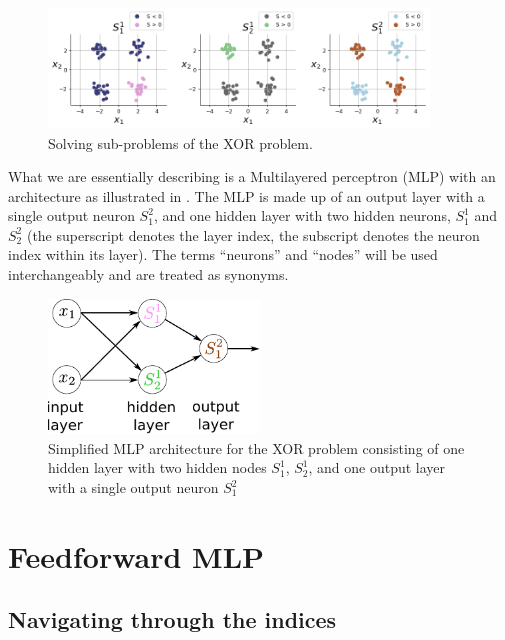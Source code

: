 \begin{frame}
\begin{figure}[ht]
    \centering
	\includegraphics[width=0.9\textwidth]{img/build_xor.png}
	\caption{Solving sub-problems of the XOR problem.}
	\label{fig:build_xor} 
\end{figure}

What we are essentially describing is a Multilayered perceptron (MLP) with an architecture as illustrated in . The MLP is made up of an output layer with  a single output neuron $S^2_1$, and one hidden layer with two hidden neurons, $S^1_1$ and $S^2_2$ (the superscript denotes the layer index, the subscript denotes the neuron index within its layer). The terms ``neurons'' and ``nodes'' will be used interchangeably and are treated as synonyms.

\begin{figure}[ht]
    \centering
	\includegraphics[width=0.5\textwidth]{img/xor_mlp_arch}
	\caption{Simplified MLP architecture for the XOR problem consisting of one hidden layer with two hidden nodes $S^1_1$, $S^1_2$, and one output layer with a single output neuron $S^2_1$}
	\label{fig:xor_mlp_arch} 
\end{figure}

\end{frame}

\clearpage

\section{Feedforward MLP}
\subsection{Navigating through the indices}

